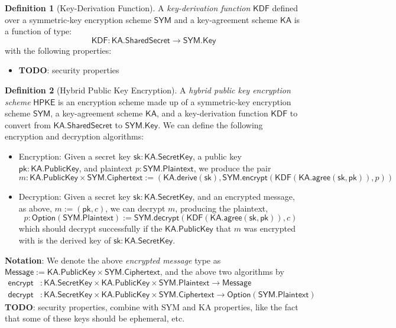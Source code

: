 \documentclass[a4paper]{article}
\newcommand{\TODO}[1]{{\color{red}\textbf{TODO}}: #1}
\theoremstyle{definition}
\newtheorem{definition}{Definition}[subsection]
\newcommand{\Ciphertext}{{\textsf{Ciphertext}}}
\newcommand{\HPKE}{{\textsf{HPKE}}}
\newcommand{\KA}{{\textsf{KA}}}
\newcommand{\KDF}{{\textsf{KDF}}}
\newcommand{\Key}{{\textsf{Key}}}
\newcommand{\Message}{{\textsf{Message}}}
\newcommand{\Option}{{\textsf{Option}}}
\newcommand{\Plaintext}{{\textsf{Plaintext}}}
\newcommand{\PublicKey}{{\textsf{PublicKey}}}
\newcommand{\SYM}{{\textsf{SYM}}}
\newcommand{\SecretKey}{{\textsf{SecretKey}}}
\newcommand{\SharedSecret}{{\textsf{SharedSecret}}}
\newcommand{\agree}{{\textsf{agree}}}
\newcommand{\decrypt}{{\textsf{decrypt}}}
\newcommand{\derive}{{\textsf{derive}}}
\newcommand{\encrypt}{{\textsf{encrypt}}}
\newcommand{\pk}{{\textsf{pk}}}
\newcommand{\sk}{{\textsf{sk}}}
\begin{document}
\begin{definition}[Key-Derivation Function]
    A \emph{key-derivation function} $\KDF$ defined over a symmetric-key encryption scheme $\SYM$ and a key-agreement scheme $\KA$ is a function of type:
    \[\KDF : \KA.\SharedSecret \to \SYM.\Key\]
    with the following properties:
    \begin{itemize}
        \item \TODO{security properties}
    \end{itemize}
\end{definition}

\begin{definition}[Hybrid Public Key Encryption]
    A \emph{hybrid public key encryption scheme} \cite{irtf-cfrg-hpke-12} $\HPKE$ is an encryption scheme made up of a symmetric-key encryption scheme $\SYM$, a key-agreement scheme $\KA$, and a key-derivation function $\KDF$ to convert from $\KA.\SharedSecret$ to $\SYM.\Key$. We can define the following encryption and decryption algorithms:
    \begin{itemize}
        \item Encryption: Given a secret key $\sk: \KA.\SecretKey$, a public key $\pk: \KA.\PublicKey$, and plaintext $p : \SYM.\Plaintext$, we produce the pair
            \[m : \KA.\PublicKey \times \SYM.\Ciphertext := \left(\KA.\derive(\sk), \SYM.\encrypt(\KDF(\KA.\agree(\sk, \pk)), p)\right)\]
        \item Decryption: Given a secret key $\sk : \KA.\SecretKey$, and an encrypted message, as above, $m := (\pk, c)$, we can decrypt $m$, producing the plaintext,
            \[p : \Option(\SYM.\Plaintext) := \SYM.\decrypt(\KDF(\KA.\agree(\sk, \pk)), c)\]
            which should decrypt successfully if the $\KA.\PublicKey$ that $m$ was encrypted with is the derived key of $\sk : \KA.\SecretKey$.
    \end{itemize}

    \textbf{Notation}: We denote the above \emph{encrypted message} type as $\Message := \KA.\PublicKey \times \SYM.\Ciphertext$, and the above two algorithms by
    \begin{align*}
        \encrypt &: \KA.\SecretKey \times \KA.\PublicKey \times \SYM.\Plaintext \to \Message \\
        \decrypt &: \KA.\SecretKey \times \KA.\PublicKey \times \SYM.\Ciphertext \to \Option(\SYM.\Plaintext)
    \end{align*}
    \TODO{security properties, combine with \SYM{} and \KA{} properties, like the fact that some of these keys should be ephemeral, etc.} \\
\end{definition}
\end{document}
